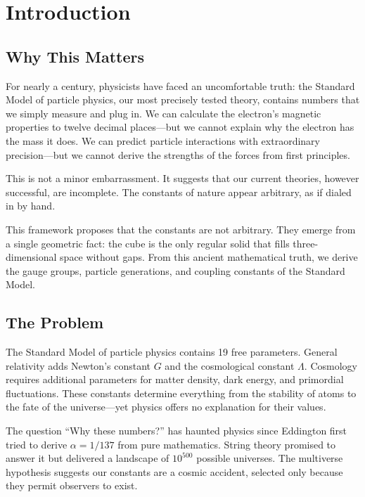 \documentclass[11pt,a4paper]{article}
\theoremstyle{plain}
\theoremstyle{definition}
\theoremstyle{remark}
\begin{document}
\section{Introduction}

\subsection{Why This Matters}

For nearly a century, physicists have faced an uncomfortable truth: the Standard Model of particle physics, our most precisely tested theory, contains numbers that we simply measure and plug in. We can calculate the electron's magnetic properties to twelve decimal places---but we cannot explain why the electron has the mass it does. We can predict particle interactions with extraordinary precision---but we cannot derive the strengths of the forces from first principles.

This is not a minor embarrassment. It suggests that our current theories, however successful, are incomplete. The constants of nature appear arbitrary, as if dialed in by hand.

This framework proposes that the constants are not arbitrary. They emerge from a single geometric fact: the cube is the only regular solid that fills three-dimensional space without gaps. From this ancient mathematical truth, we derive the gauge groups, particle generations, and coupling constants of the Standard Model.

\subsection{The Problem}

The Standard Model of particle physics contains 19 free parameters. General relativity adds Newton's constant $G$ and the cosmological constant $\Lambda$. Cosmology requires additional parameters for matter density, dark energy, and primordial fluctuations. These constants determine everything from the stability of atoms to the fate of the universe---yet physics offers no explanation for their values.

The question ``Why these numbers?'' has haunted physics since Eddington first tried to derive $\alpha = 1/137$ from pure mathematics. String theory promised to answer it but delivered a landscape of $10^{500}$ possible universes. The multiverse hypothesis suggests our constants are a cosmic accident, selected only because they permit observers to exist.
\end{document}
